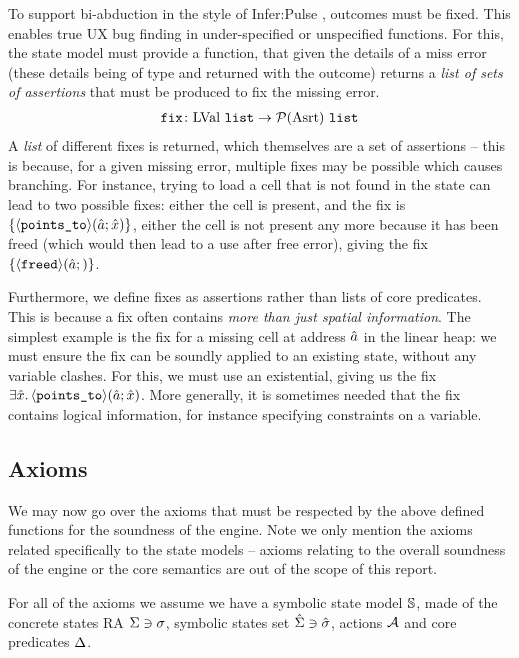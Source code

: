 To support bi-abduction in the style of Infer:Pulse \cite{pulse}, \Miss{} outcomes must be fixed. This enables true UX bug finding in under-specified or unspecified functions. For this, the state model must provide a \fix{} function, that given the details of a miss error (these details being of type \lvallist{} and returned with the outcome) returns a \emph{list of sets of assertions} that must be produced to fix the missing error.
\begin{align*}
	\texttt{fix} \colon \text{LVal}~\texttt{list} \rightarrow {\cal P}(\text{Asrt}) ~\texttt{list}
\end{align*}
A \emph{list} of different fixes is returned, which themselves are a set of assertions -- this is because, for a given missing error, multiple fixes may be possible which causes branching. For instance, trying to load a cell that is not found in the state can lead to two possible fixes: either the cell is present, and the fix is $\{ \left<\texttt{points\_to}\right>\!(\hat{a};\hat{x}) \}$, either the cell is not present any more because it has been freed (which would then lead to a use after free error), giving the fix $\{{\left<\texttt{freed}\right>\!(\hat{a};)}\}$.

Furthermore, we define fixes as assertions rather than lists of core predicates. This is because a fix often contains \emph{more than just spatial information}. The simplest example is the fix for a missing cell at address $\hat{a}$ in the linear heap: we must ensure the fix can be soundly applied to an existing state, without any variable clashes. For this, we must use an existential, giving us the fix $\exists \hat{x}\ldotp \left<\texttt{points\_to}\right>\!(\hat{a};\hat{x})$. More generally, it is sometimes needed that the fix contains logical information, for instance specifying constraints on a variable.

\subsection{Axioms}

We may now go over the axioms that must be respected by the above defined functions for the soundness of the engine. Note we only mention the axioms related specifically to the state models -- axioms relating to the overall soundness of the engine or the core semantics are out of the scope of this report.

For all of the axioms we assume we have a symbolic state model $\mathbb S$, made of the concrete states RA $\Sigma \ni \sigma$, symbolic states set $\hat{\Sigma} \ni \hat{\sigma}$, actions ${\cal{A}}$ and core predicates $\Delta$.

